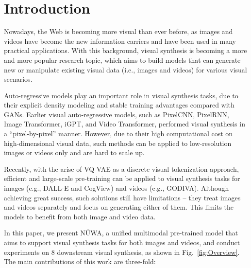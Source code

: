 \documentclass[10pt,twocolumn,letterpaper]{article}
\begin{document}
\section{Introduction}\label{sec:intro}

Nowadays, the Web is becoming more visual than ever before, as images and videos have become the new information carriers and have been used in many practical applications. With this background, visual synthesis is becoming a more and more popular research topic, which aims to build models that can generate new or manipulate existing visual data (i.e., images and videos) for various visual scenarios.

Auto-regressive models\cite{vanoordPixelRecurrentNeural2016,oordConditionalImageGeneration2016,wuGODIVAGeneratingOpenDomaIn2021,rameshZeroShotTexttoImageGeneration2021} play an important role in visual synthesis tasks, due to their explicit density modeling and stable training advantages compared with GANs\cite{brockLargeScaleGAN2019,tulyakovMocoganDecomposingMotion2018,xuAttnganFinegrainedText2018,radfordUnsupervisedRepresentationLearning2015}. 
Earlier visual auto-regressive models, such as PixelCNN\cite{oordConditionalImageGeneration2016}, PixelRNN\cite{vanoordPixelRecurrentNeural2016}, Image Transformer\cite{parmarImageTransformer2018}, iGPT\cite{chenGenerativepretrainingPixels2020}, and Video Transformer\cite{weissenbornScalingAutoregressiveVideo2020}, performed visual synthesis in a ``pixel-by-pixel'' manner.
However, due to their high computational cost on high-dimensional visual data, such methods can be applied to low-resolution images or videos only and are hard to scale up.



Recently, with the arise of VQ-VAE\cite{oordNeuralDiscreteRepresentation2017} as a discrete visual tokenization approach, efficient and large-scale pre-training can be applied to visual synthesis tasks for images (e.g., DALL-E\cite{rameshZeroShotTexttoImageGeneration2021} and CogView\cite{dingCogViewMasteringTexttoImage2021}) and videos (e.g., GODIVA\cite{wuGODIVAGeneratingOpenDomaIn2021}). Although achieving great success, such solutions still have limitations -- they treat images and videos separately and focus on generating either of them. This limits the models to benefit from both image and video data.

In this paper, we present NÜWA, a unified multimodal pre-trained model that aims to support visual synthesis tasks for both images and videos, and conduct experiments on 8 downstream visual synthesis, as shown in Fig.~\ref{fig:Overview}.
The main contributions of this work are three-fold:
\end{document}
